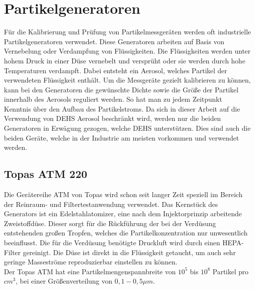 \section{Partikelgeneratoren}
F\"{u}r die Kalibrierung und Pr\"{u}fung von Partikelmessger\"{a}ten werden oft industrielle Partikelgeneratoren verwendet. Diese Generatoren arbeiten auf Basis von Vernebelung oder Verdampfung von Fl\"{u}ssigkeiten. Die Fl\"{u}ssigkeiten werden unter hohem Druck in einer D\"{u}se vernebelt und verspr\"{u}ht oder sie werden durch hohe Temperaturen verdampft. Dabei entsteht ein Aerosol, welches Partikel der verwendeten Fl\"{u}ssigkeit enth\"{a}lt. Um die Messger\"{a}te gezielt kalibrieren zu k\"{o}nnen, kann bei den Generatoren die gew\"{u}nschte Dichte sowie die Gr\"{o}{\ss}e der Partikel innerhalb des Aerosols reguliert werden. So hat man zu jedem Zeitpunkt Kenntnis \"{u}ber den Aufbau des Partikelstroms. Da sich in dieser Arbeit auf die Verwendung von DEHS Aerosol beschr\"{a}nkt wird, werden nur die beiden Generatoren in Erw\"{a}gung gezogen, welche DEHS unterst\"{u}tzen. Dies sind auch die beiden Ger\"{a}te, welche in der Industrie am meisten vorkommen und verwendet werden.

\subsection{Topas ATM 220}
Die Ger\"{a}tereihe ATM von Topas wird schon seit langer Zeit speziell im Bereich der Reinraum- und Filtertestanwendung verwendet. Das Kernst\"{u}ck des Generators ist ein Edelstahlatomizer, eine nach dem Injektorprinzip arbeitende Zweistoffd\"{u}se. Dieser sorgt f\"{u}r die R\"{u}ckf\"{u}hrung der bei der Verd\"{u}sung entstehenden gro{\ss}en Tropfen, welches die Partikelkonzentration nur unwesentlich beeinflusst. Die f\"{u}r die Verd\"{u}sung ben\"{o}tigte Druckluft wird durch einen HEPA-Filter gereinigt. Die D\"{u}se ist direkt in die Fl\"{u}ssigkeit getaucht, um auch sehr geringe Massestr\"{o}me reproduzierbar einstellen zu k\"{o}nnen.\\
Der Topas ATM hat eine Partikelmengenspannbreite  von \(10^5\) bis \(10^8\) Partikel pro \(cm^3\), bei einer Gr\"{o}{\ss}enverteilung von \(0,1 - 0,5 \mu m\).\cite{topas}

